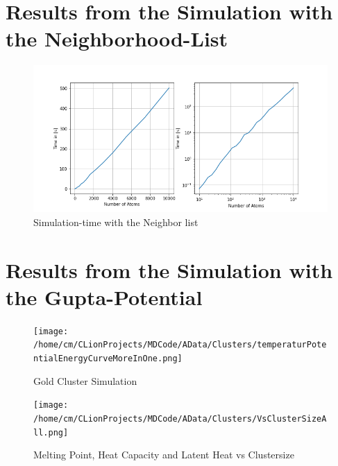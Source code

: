 \section{Results from the Simulation with the Neighborhood-List}

\begin{figure}[!h]
	\begin{center}
		\includegraphics[scale=1.25]{Figure/plotAtomTimesMoreData.png}
	\end{center}
	\caption[Simulation-time with the Neighbor-list]{Simulation-time with the Neighbor list}
	\label{PlotSimulationTimesCutoffNew}
\end{figure}

\section{Results from the Simulation with the Gupta-Potential}

\begin{figure}[!h] 
	\begin{center} 
		\texttt{[image: /home/cm/CLionProjects/MDCode/AData/Clusters/temperaturPotentialEnergyCurveMoreInOne.png]} 
	\end{center} 
	\caption[Gold Cluster Simulation]{Gold Cluster Simulation} 
	\label{GoldClusterSimulationTemperaturEnergy4In1} 
\end{figure} 

\begin{figure}[!h] 
	\begin{center} 
		\texttt{[image: /home/cm/CLionProjects/MDCode/AData/Clusters/VsClusterSizeAll.png]} 
	\end{center} 
	\caption[Melting Point, Heat Capacity and Latent Heat vs Clustersize]{Melting Point, Heat Capacity and Latent Heat vs Clustersize} 
	\label{GoldClusterSimulationVsClustersize} 
\end{figure} 

